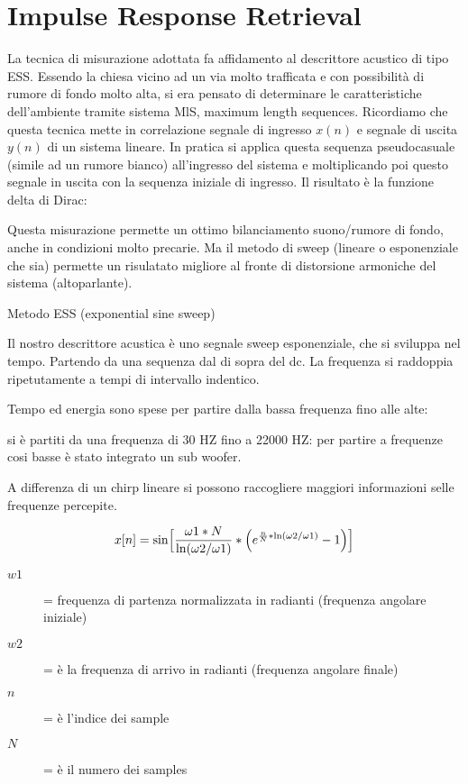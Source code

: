 \section{Impulse Response Retrieval} 

La tecnica di misurazione adottata fa affidamento al descrittore acustico di tipo ESS.
Essendo la chiesa vicino ad un via molto trafficata e con possibilità di rumore di
fondo molto alta, si era pensato di determinare le caratteristiche dell'ambiente
tramite sistema MlS, maximum length sequences. 
Ricordiamo che questa tecnica mette in correlazione segnale di ingresso $ x(n) $
e segnale di uscita $ y(n) $ di un sistema lineare. 
In pratica si applica questa sequenza pseudocasuale (simile ad un rumore bianco)
all'ingresso del sistema e moltiplicando poi questo segnale in uscita con la
sequenza iniziale di ingresso. Il risultato è la funzione delta di Dirac:

Questa misurazione permette un ottimo bilanciamento suono/rumore di fondo,
anche in condizioni molto precarie.
Ma il metodo  di sweep (lineare o esponenziale che sia) permette un risulatato
migliore al fronte di distorsione armoniche del sistema (altoparlante).

Metodo ESS (exponential sine sweep)

Il nostro descrittore acustica è uno segnale sweep esponenziale, che si sviluppa nel tempo.
Partendo da una sequenza dal di sopra del dc. 
La frequenza si raddoppia ripetutamente a tempi di intervallo indentico.

Tempo ed energia sono spese per partire dalla bassa frequenza fino alle alte:

si è partiti da una frequenza di 30 HZ fino a 22000 HZ:
per partire a frequenze cosi basse è stato integrato un sub woofer.

A differenza di un chirp lineare si possono raccogliere maggiori informazioni selle frequenze percepite. 

\begin{equation}
x[n] = \sin \Bigl[\frac{\omega1*N}{\ln(\omega2/\omega1)}*\Bigl(e^{\frac{n}{N}*\ln(\omega2/\omega1)}-1\Bigr)\Bigr]
\end{equation}

\begin{description}
	\item [$w1$] = frequenza di partenza normalizzata in radianti \newline (frequenza angolare iniziale)
	\item [$w2$] = è la frequenza di arrivo in radianti (frequenza angolare finale)
	\item [$n$] = è l'indice dei sample
	\item [$N$] = è il numero dei samples
\end{description}

